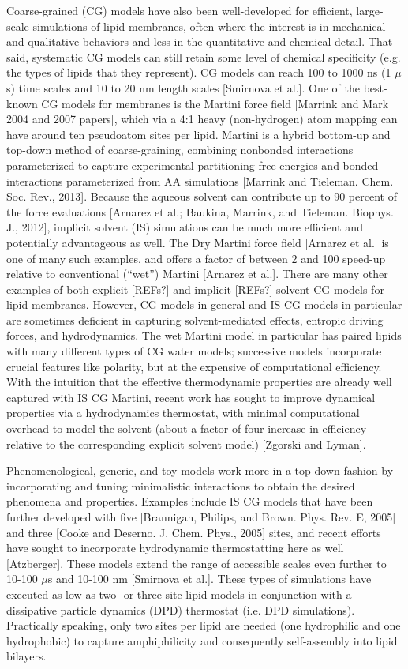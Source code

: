 \documentclass[9pt,bestpractices]{livecoms}
\begin{document}
Coarse-grained (CG) models have also been well-developed for efficient, large-scale simulations of lipid membranes, often where the interest is in mechanical and qualitative behaviors and less in the quantitative and chemical detail.
That said, systematic CG models can still retain some level of chemical specificity (e.g. the types of lipids that they represent).
CG models can reach 100 to 1000 ns (1 $\mu$s) time scales and 10 to 20 nm length scales [Smirnova et al.].
One of the best-known CG models for membranes is the Martini force field [Marrink and Mark 2004 and 2007 papers], which via a 4:1 heavy (non-hydrogen) atom mapping can have around ten pseudoatom sites per lipid. Martini is a hybrid bottom-up and top-down method of coarse-graining, combining nonbonded interactions parameterized to capture experimental partitioning free energies and bonded interactions parameterized from AA simulations [Marrink and Tieleman. Chem. Soc. Rev., 2013].
Because the aqueous solvent can contribute up to 90 percent of the force evaluations [Arnarez et al.; Baukina, Marrink, and Tieleman. Biophys. J., 2012], implicit solvent (IS) simulations can be much more efficient and potentially advantageous as well.
The Dry Martini force field [Arnarez et al.] is one of many such examples, and offers a factor of between 2 and 100 speed-up relative to conventional (``wet'') Martini [Arnarez et al.].
There are many other examples of both explicit [REFs?] and implicit [REFs?] solvent CG models for lipid membranes.
However, CG models in general and IS CG models in particular are sometimes deficient in capturing solvent-mediated effects, entropic driving forces, and hydrodynamics.
The wet Martini model in particular has paired lipids with many different types of CG water models; successive models incorporate crucial features like polarity, but at the expensive of computational efficiency.
With the intuition that the effective thermodynamic properties are already well captured with IS CG Martini, recent work has sought to improve dynamical properties via a hydrodynamics thermostat, with minimal computational overhead to model the solvent (about a factor of four increase in efficiency relative to the corresponding explicit solvent model) [Zgorski and Lyman].

Phenomenological, generic, and toy models work more in a top-down fashion by incorporating and tuning minimalistic interactions to obtain the desired phenomena and properties.
Examples include IS CG models that have been further developed with five [Brannigan, Philips, and Brown. Phys. Rev. E, 2005] and three [Cooke and Deserno. J. Chem. Phys., 2005] sites, and recent efforts have sought to incorporate hydrodynamic thermostatting here as well [Atzberger].
These models extend the range of accessible scales even further to 10-100 $\mu$s and 10-100 nm [Smirnova et al.].
These types of simulations have executed as low as two- or three-site lipid models in conjunction with a dissipative particle dynamics (DPD) thermostat (i.e. DPD simulations).
Practically speaking, only two sites per lipid are needed (one hydrophilic and one hydrophobic) to capture amphiphilicity and consequently self-assembly into lipid bilayers.
\end{document}
